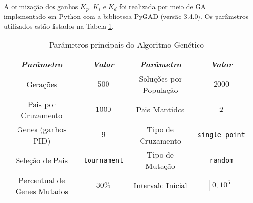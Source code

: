 

A otimização dos ganhos $K_p$, $K_i$ e $K_d$ foi realizada por meio de GA implementado em Python 
com a biblioteca PyGAD (versão 3.4.0). Os parâmetros utilizados estão listados na Tabela 
\ref{tab:ga_params_summary}.
\vspace{-0.2cm}
\begin{table}[h!]
    \centering
    \caption{Parâmetros principais do Algoritmo Genético}
    \begin{tabular}{|c|c||c|c|}
        \hline
        \emph{Parâmetro} & \emph{Valor} & \emph{Parâmetro} & \emph{Valor} \\
        \hline
        Gerações & $500$ & Soluções por População & $2000$ \\
        \hline
        Pais por Cruzamento & $1000$ & Pais Mantidos & $2$ \\
        \hline
        Genes (ganhos PID) & $9$ & Tipo de Cruzamento & \texttt{single\_point} \\
        \hline
        Seleção de Pais & \texttt{tournament} & Tipo de Mutação & \texttt{random} \\
        \hline
        Percentual de Genes Mutados & $30\%$ & Intervalo Inicial & $[0, 10^5]$ \\
        \hline
    \end{tabular}
    \label{tab:ga_params_summary}
\end{table}

